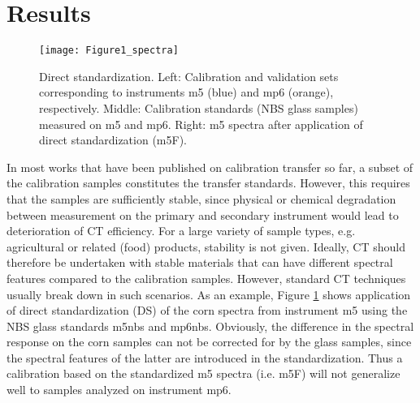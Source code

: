 \documentclass{article}
\begin{document}
\section{Results}
\begin{figure}[ht!]
	\centering
	\texttt{[image: Figure1\_spectra]}
	\caption{Direct standardization. Left: Calibration  and validation sets corresponding to instruments m5 (blue) and mp6 (orange), respectively. Middle: Calibration standards (NBS glass samples) measured on m5 and mp6. Right: m5 spectra after application of direct standardization (m5F).}
	\label{fig:figure1spectra}
\end{figure}
In most works that have been published on calibration transfer so far, a subset of the calibration samples constitutes the transfer standards. However, this requires that the samples are sufficiently stable, since physical or chemical degradation between measurement on the primary and secondary instrument would lead to deterioration of CT efficiency. For a large variety of sample types, e.g. agricultural or related (food) products, stability is not given. Ideally, CT should therefore be undertaken with stable materials that can have different spectral features compared to the calibration samples. However, standard CT techniques usually break down in such scenarios. As an example, Figure \ref{fig:figure1spectra} shows application of direct standardization (DS) of the corn spectra from instrument m5 using the NBS glass standards m5nbs and mp6nbs. Obviously, the difference in the spectral response on the corn samples can not be corrected for by the glass samples, since the spectral features of the latter are introduced in the standardization. Thus a calibration based on the standardized m5 spectra (i.e. m5F) will not generalize well to samples analyzed on instrument mp6. 
\end{document}
